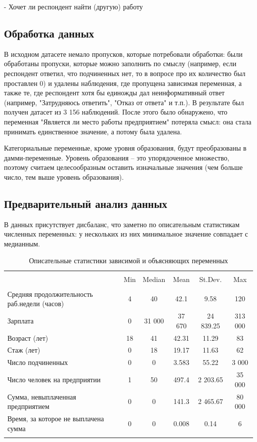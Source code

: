 \documentclass[12pt, a4paper]{article}
\begin{document}
{    -   Хочет ли респондент найти (другую) работу

\subsection{Обработка данных}
В исходном датасете немало пропусков, которые потребовали обработки: были обработаны пропуски, которые можно заполнить по смыслу (например, если респондент ответил, что подчиненных нет, то в вопросе про их количество был проставлен 0) и удалены наблюдения, где пропущена зависимая переменная, а также те, где респондент хотя бы единожды дал неинформативный ответ (например, "Затрудняюсь ответить", "Отказ от ответа" и т.п.). В результате был получен датасет из 3 156 наблюдений. После этого было обнаружено, что переменная "Является ли место работы предприятием" потеряла смысл: она стала принимать единственное значение, а потому была удалена. 

Категориальные переменные, кроме уровня образования, будут преобразованы в дамми-переменные. Уровень образования -- это упорядоченное множество, поэтому считаем целесообразным оставить изначальные значения (чем больше число, тем выше уровень образования). 

\subsection{Предварительный анализ данных}
В данных присутствует дисбаланс, что заметно по описательным статистикам численных переменных: у нескольких из них минимальное значение совпадает с медианным. 
\begin{table}[h] 
\centering 
\caption{Описательные статистики зависимой и объясняющих переменных} 
\label{tab:descriptive_stats} 
\begin{tabular}{@{}p{8cm}ccccc@{}} \hline 
\hline \\[-1.8ex] 
  & Min & Median & Mean & St.Dev. & Max \\
\hline \\[-1.8ex] 
Средняя продолжительность раб.недели (часов)& 4 & 40 & 42.1 & 9.58 & 120 \\
Зарплата & 0 & 31 000 & 37 670 & 24 839.25 & 313 000 \\
Возраст (лет) & 18 & 41 & 42.31 & 11.29 & 83 \\
Стаж (лет) & 0 & 18 & 19.17 & 11.63 & 62 \\
Число подчиненных & 0 & 0 & 3.583 & 55.22 & 3 000 \\
Число человек на предприятии & 1 & 50 & 497.4 & 2 203.65 & 35 000 \\
Сумма, невыплаченная предприятием & 0 & 0 & 141.3 & 2 465.67 & 80 000 \\
Время, за которое не выплачена сумма & 0 & 0 & 0.008 & 0.14 & 6 \\
\hline \\[-1.8ex] 
\end{tabular}
\end{table} 

}
\end{document}
